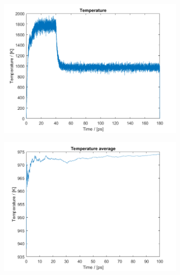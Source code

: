 \begin{figure}[H]
\begin{subfigure}[b]{0.40\textwidth}
    \end{subfigure}
    \begin{subfigure}[b]{0.40\textwidth}
        \centering
        \includegraphics[width=\textwidth]{graphics/task4/temperature.png}
    \end{subfigure}
    \begin{subfigure}[b]{0.40\textwidth}
        \centering
        \includegraphics[width=\textwidth]{graphics/task4/temperature_avg.png}
    \end{subfigure}
    \begin{subfigure}[b]{0.40\textwidth}
        \centering

\end{subfigure}
\end{figure}
